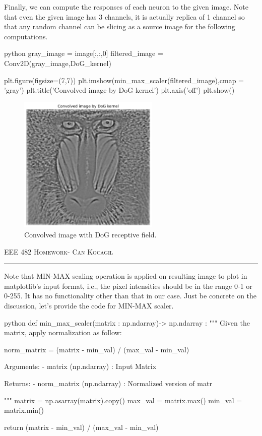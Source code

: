 \documentclass[12pt]{amsart}
\begin{document}
Finally, we can compute the responses of each neuron to the given image. Note that even the given image has 3 channels, it is actually replica of 1 channel so that any random channel can be slicing as a source image for the following computations.

\begin{mintedbox}{python}
gray_image = image[:,:,0]
filtered_image = Conv2D(gray_image,DoG_kernel)

plt.figure(figsize=(7,7))
plt.imshow(min_max_scaler(filtered_image),cmap = 'gray')
plt.title('Convolved image by DoG kernel')
plt.axis('off')
plt.show()
\end{mintedbox}


\begin{figure}[h]
    \centering
    \includegraphics[width = 0.6\textwidth]{images/CONV_image.png}
    \caption{Convolved image with DoG receptive field.}
\end{figure}


\newpage
{\scshape EEE 482} \hfill {\scshape \large  Homework-\relax} \hfill {\scshape Can Kocagil}
\smallskip
\hrule
\vspace{2mm}

Note that MIN-MAX scaling operation is applied on resulting image to plot in matplotlib's input format, i.e., the pixel intensities should be in the range 0-1 or 0-255. It has no functionality other than that in our case. Just be concrete on the discussion, let's provide the code for MIN-MAX scaler.

\begin{mintedbox}{python}
def min_max_scaler(matrix : np.ndarray)-> np.ndarray :
  """
    Given the matrix, apply normalization as follow:

        norm_matrix = (matrix - min_val) / (max_val - min_val)

    Arguments:
      -  matrix     (np.ndarray) : Input Matrix

    Returns:
      - norm_matrix (np.ndarray) : Normalized version of matr

  """
  matrix = np.asarray(matrix).copy()
  max_val = matrix.max()
  min_val = matrix.min()

  return (matrix - min_val) / (max_val - min_val)
\end{mintedbox}
\end{document}
